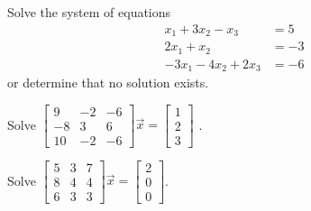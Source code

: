 \documentclass{ximera}
\begin{document}
\begin{exercise}%
    Solve the system of equations
    \begin{equation*}
        \begin{split}
             x_1  + 3x_2  - x_3 &= 5 \\ 
             2x_1 +x_2 &= -3\\
            -3x_1 - 4x_2 + 2x_3 &= -6 
        \end{split}
    \end{equation*}
    or determine that no solution exists.
\end{exercise}

\begin{exercise}
    Solve
    $\left[ 
        \begin{smallmatrix}
            9 & -2 & -6 \\
            -8 & 3 & 6 \\
            10 & -2 & -6
        \end{smallmatrix} 
    \right] 
    \vec{x} =
    \left[ 
        \begin{smallmatrix}
            1 \\
            2 \\
            3
        \end{smallmatrix} 
    \right]$ .
\end{exercise}

\begin{exercise}
    Solve
    $\left[ 
        \begin{smallmatrix}
            5 & 3 & 7 \\
            8 & 4 & 4 \\
            6 & 3 & 3
        \end{smallmatrix} 
    \right] 
    \vec{x} =
    \left[ 
        \begin{smallmatrix}
            2 \\
            0 \\
            0
        \end{smallmatrix} 
    \right]$.
\end{exercise}
\end{document}
